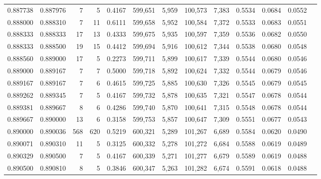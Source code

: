 \begin{tabular}{rrrrrrrrrrrrr}
0.887738 & 0.887976 &     7 &   5 &                                     0.4167 & 599,651 &   5,959 & 100,573 &   7,383 & 0.5534 & 0.0684 & 0.0552 \\
0.888000 & 0.888310 &     7 &  11 &                                     0.6111 & 599,658 &   5,952 & 100,584 &   7,372 & 0.5533 & 0.0683 & 0.0551 \\
0.888333 & 0.888333 &    17 &  13 &                                     0.4333 & 599,675 &   5,935 & 100,597 &   7,359 & 0.5536 & 0.0682 & 0.0550 \\
0.888333 & 0.888500 &    19 &  15 &                                     0.4412 & 599,694 &   5,916 & 100,612 &   7,344 & 0.5538 & 0.0680 & 0.0548 \\
0.888560 & 0.889000 &    17 &   5 &                                     0.2273 & 599,711 &   5,899 & 100,617 &   7,339 & 0.5544 & 0.0680 & 0.0546 \\
0.889000 & 0.889167 &     7 &   7 &                                     0.5000 & 599,718 &   5,892 & 100,624 &   7,332 & 0.5544 & 0.0679 & 0.0546 \\
0.889167 & 0.889167 &     7 &   6 &                                     0.4615 & 599,725 &   5,885 & 100,630 &   7,326 & 0.5545 & 0.0679 & 0.0545 \\
0.889262 & 0.889345 &     7 &   5 &                                     0.4167 & 599,732 &   5,878 & 100,635 &   7,321 & 0.5547 & 0.0678 & 0.0544 \\
0.889381 & 0.889667 &     8 &   6 &                                     0.4286 & 599,740 &   5,870 & 100,641 &   7,315 & 0.5548 & 0.0678 & 0.0544 \\
0.889667 & 0.890000 &    13 &   6 &                                     0.3158 & 599,753 &   5,857 & 100,647 &   7,309 & 0.5551 & 0.0677 & 0.0543 \\
0.890000 & 0.890036 &   568 & 620 &                                     0.5219 & 600,321 &   5,289 & 101,267 &   6,689 & 0.5584 & 0.0620 & 0.0490 \\
0.890071 & 0.890310 &    11 &   5 &                                     0.3125 & 600,332 &   5,278 & 101,272 &   6,684 & 0.5588 & 0.0619 & 0.0489 \\
0.890329 & 0.890500 &     7 &   5 &                                     0.4167 & 600,339 &   5,271 & 101,277 &   6,679 & 0.5589 & 0.0619 & 0.0488 \\
0.890500 & 0.890810 &     8 &   5 &                                     0.3846 & 600,347 &   5,263 & 101,282 &   6,674 & 0.5591 & 0.0618 & 0.0488 \\

\end{tabular}
